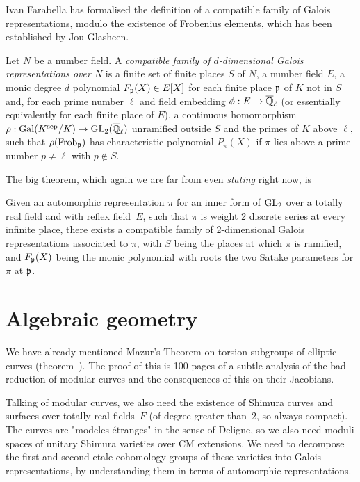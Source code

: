 Ivan Farabella has formalised the definition of a compatible family of Galois
representations, modulo the existence of Frobenius elements, which has been
established by Jou Glasheen. 

\begin{definition}\label{compatible_family} Let $N$ be a number field. A \emph{compatible family of $d$-dimensional Galois representations over $N$} is a finite set of finite places $S$ of $N$,
a number field $E$, a monic degree $d$ polynomial $F_{{\mathfrak{p}}}(X)\in E[X]$ for each finite place ${\mathfrak{p}}$ of $K$ not in $S$ and, for each prime number $\ell$ and field embedding $\phi : E\to\overline{\mathbb{Q}}_\ell$ (or essentially equivalently for each finite place of $E$), a continuous homomorphism $\rho:\operatorname{Gal}(K^{\operatorname{sep}}/K)\to\operatorname{GL}_2(\overline{\mathbb{Q}}_\ell)$ unramified outside $S$ and the primes of $K$ above $\ell$, such that $\rho(\operatorname{Frob}_{\mathfrak{p}})$ has characteristic polynomial $P_\pi(X)$ if $\pi$ lies above a prime number $p\not=\ell$ with $p\not\in S$.
\end{definition}

The big theorem, which again we are far from even \emph{stating} right now, is

\begin{theorem}\label{Galois_representation_from_automorphic_representation_on_GL_2_form}\notready Given an automorphic representation $\pi$ for an inner form of $\operatorname{GL}_2$ over a totally real field and with reflex field~$E$, such that $\pi$ is weight 2 discrete series at every infinite place, there exists a compatible family of 2-dimensional Galois representations associated to $\pi$, with $S$ being the places at which $\pi$ is ramified, and $F_{{\mathfrak{p}}}(X)$ being the monic polynomial with roots the two Satake parameters for $\pi$ at ${\mathfrak{p}}$.
\end{theorem}

\section{Algebraic geometry}

We have already mentioned Mazur's Theorem on torsion subgroups of elliptic curves (theorem~\cite{mazur}).
The proof of this is 100 pages of a subtle analysis of the bad reduction of modular curves and the consequences of this on their Jacobians.

Talking of modular curves, we also need the existence of Shimura curves and surfaces over totally real fields~$F$ (of degree greater than~2, so always compact). The curves are "modeles \'etranges" in the sense of Deligne, so we also need moduli spaces of unitary Shimura varieties over CM extensions. We need to decompose the first and second etale cohomology groups of these varieties into Galois representations, by understanding them
in terms of automorphic representations.

